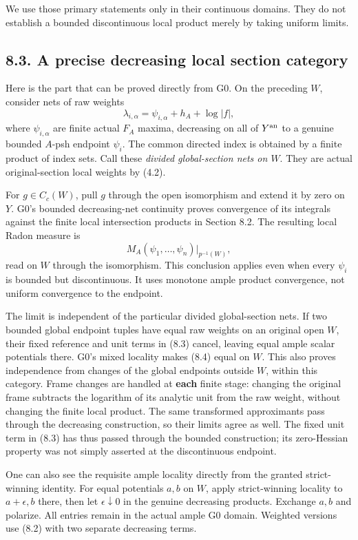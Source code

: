\documentclass[
  10pt,
]{article}
\begin{document}
We use those primary statements only in their continuous domains. They
do not establish a bounded discontinuous local product merely by taking
uniform limits.

\subsection{8.3. A precise decreasing local section
category}\label{a-precise-decreasing-local-section-category}

Here is the part that can be proved directly from G0. On the preceding
\(W\), consider nets of raw weights
\[\lambda_{i,\alpha}=\psi_{i,\alpha}+h_A+\log|f|,\] where
\(\psi_{i,\alpha}\) are finite actual \(F_A\) maxima, decreasing on all
of \(Y^{\rm an}\) to a genuine bounded \(A\)-psh endpoint \(\psi_i\).
The common directed index is obtained by a finite product of index sets.
Call these \emph{divided global-section nets on \(W\)}. They are actual
original-section local weights by (4.2).

For \(g\in C_c(W)\), pull \(g\) through the open isomorphism and extend
it by zero on \(Y\). G0's bounded decreasing-net continuity proves
convergence of its integrals against the finite local intersection
products in Section 8.2. The resulting local Radon measure is
\[M_A(\psi_1,\ldots,\psi_n)|_{p^{-1}(W)},                \tag{8.4}\]
read on \(W\) through the isomorphism. This conclusion applies even when
every \(\psi_i\) is bounded but discontinuous. It uses monotone ample
product convergence, not uniform convergence to the endpoint.

The limit is independent of the particular divided global-section nets.
If two bounded global endpoint tuples have equal raw weights on an
original open \(W\), their fixed reference and unit terms in (8.3)
cancel, leaving equal ample scalar potentials there. G0's mixed locality
makes (8.4) equal on \(W\). This also proves independence from changes
of the global endpoints outside \(W\), within this category. Frame
changes are handled at \textbf{each} finite stage: changing the original
frame subtracts the logarithm of its analytic unit from the raw weight,
without changing the finite local product. The same transformed
approximants pass through the decreasing construction, so their limits
agree as well. The fixed unit term in (8.3) has thus passed through the
bounded construction; its zero-Hessian property was not simply asserted
at the discontinuous endpoint.

One can also see the requisite ample locality directly from the granted
strict-winning identity. For equal potentials \(a,b\) on \(W\), apply
strict-winning locality to \(a+\epsilon,b\) there, then let
\(\epsilon\downarrow0\) in the genuine decreasing products. Exchange
\(a,b\) and polarize. All entries remain in the actual ample G0 domain.
Weighted versions use (8.2) with two separate decreasing terms.
\end{document}
